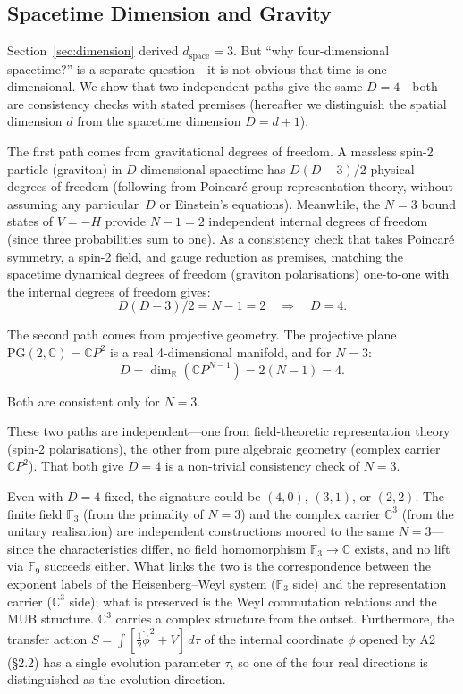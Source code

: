 \documentclass[12pt,a4paper]{article}
\begin{document}
\subsection{Spacetime Dimension and Gravity}\label{sec:spacetime-dim}

Section~\ref{sec:dimension} derived $d_\mathrm{space} = 3$. But ``why four-dimensional spacetime?'' is a separate question---it is not obvious that time is one-dimensional. We show that two independent paths give the same $D = 4$---both are consistency checks with stated premises (hereafter we distinguish the spatial dimension $d$ from the spacetime dimension $D = d + 1$).

The first path comes from gravitational degrees of freedom. A massless spin-2 particle (graviton) in $D$-dimensional spacetime has $D(D{-}3)/2$ physical degrees of freedom (following from Poincar\'e-group representation theory, without assuming any particular~$D$ or Einstein's equations). Meanwhile, the $N = 3$ bound states of $V = -H$ provide $N{-}1 = 2$ independent internal degrees of freedom (since three probabilities sum to one). As a consistency check that takes Poincar\'e symmetry, a spin-2 field, and gauge reduction as premises, matching the spacetime dynamical degrees of freedom (graviton polarisations) one-to-one with the internal degrees of freedom gives:
\begin{equation}
  D(D{-}3)/2 = N - 1 = 2 \quad\Longrightarrow\quad D = 4.
\end{equation}

The second path comes from projective geometry. The projective plane $\mathrm{PG}(2, \mathbb{C}) = \mathbb{C}P^2$ is a real 4-dimensional manifold, and for $N = 3$:
\begin{equation}
  D = \dim_{\mathbb{R}}(\mathbb{C}P^{N-1}) = 2(N{-}1) = 4.
\end{equation}

\noindent
Both are consistent only for $N = 3$.

These two paths are independent---one from field-theoretic representation theory (spin-2 polarisations), the other from pure algebraic geometry (complex carrier $\mathbb{C}P^2$). That both give $D = 4$ is a non-trivial consistency check of $N = 3$.

Even with $D = 4$ fixed, the signature could be $(4,0)$, $(3,1)$, or $(2,2)$. The finite field $\mathbb{F}_3$ (from the primality of $N = 3$) and the complex carrier $\mathbb{C}^3$ (from the unitary realisation) are independent constructions moored to the same $N = 3$---since the characteristics differ, no field homomorphism $\mathbb{F}_3 \to \mathbb{C}$ exists, and no lift via $\mathbb{F}_9$ succeeds either. What links the two is the correspondence between the exponent labels of the Heisenberg--Weyl system ($\mathbb{F}_3$ side) and the representation carrier ($\mathbb{C}^3$ side); what is preserved is the Weyl commutation relations and the MUB structure. $\mathbb{C}^3$ carries a complex structure from the outset. Furthermore, the transfer action $S = \int[\tfrac{1}{2}\dot\phi^2 + V]\,d\tau$ of the internal coordinate $\phi$ opened by A2 (\S2.2) has a single evolution parameter $\tau$, so one of the four real directions is distinguished as the evolution direction.
\end{document}

